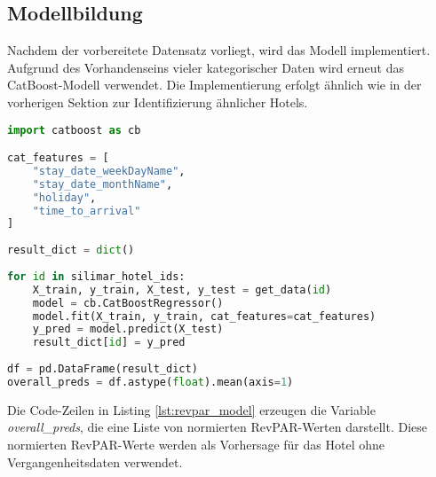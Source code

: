 \subsection{Modellbildung}
\label{subsec:revpar_model}

Nachdem der vorbereitete Datensatz vorliegt, wird das Modell implementiert. Aufgrund des Vorhandenseins vieler kategorischer Daten wird erneut das CatBoost-Modell verwendet. Die Implementierung erfolgt ähnlich wie in der vorherigen Sektion zur Identifizierung ähnlicher Hotels.

\begin{lstlisting}[language=Python, label=lst:revpar_model, caption=Erzeugung der RevPAR-Vorhersagen]
import catboost as cb

cat_features = [
    "stay_date_weekDayName",
    "stay_date_monthName",
    "holiday",
    "time_to_arrival"
]
    
result_dict = dict()
    
for id in silimar_hotel_ids:
    X_train, y_train, X_test, y_test = get_data(id)
    model = cb.CatBoostRegressor()
    model.fit(X_train, y_train, cat_features=cat_features)
    y_pred = model.predict(X_test)
    result_dict[id] = y_pred
    
df = pd.DataFrame(result_dict)
overall_preds = df.astype(float).mean(axis=1)
\end{lstlisting}

Die Code-Zeilen in Listing \ref{lst:revpar_model} erzeugen die Variable \emph{overall\_preds}, die eine Liste von normierten RevPAR-Werten darstellt. Diese normierten RevPAR-Werte werden als Vorhersage für das Hotel ohne Vergangenheitsdaten verwendet.
    